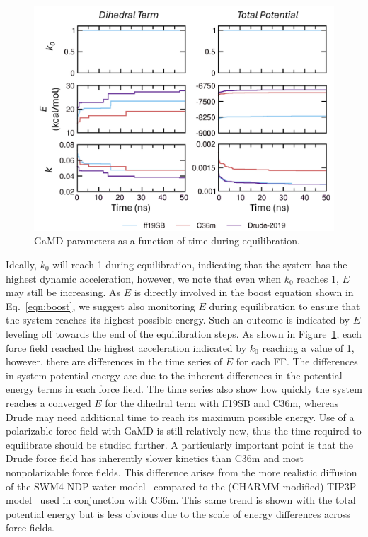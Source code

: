 \documentclass[9pt,tutorial,pubversion]{livecoms}
\begin{document}
\begin{figure}[h] 
    \includegraphics[width=\columnwidth]{main_figs/equil_conv.png}
    \caption{GaMD parameters as a function of time during equilibration.}
    \label{fig:equil_conv_alad}
\end{figure}

Ideally, $k_{0}$ will reach 1 during equilibration, indicating that the system has the highest dynamic acceleration, however, we note that even when $k_{0}$ reaches 1, $E$ may still be increasing. As $E$ is directly involved in the boost equation shown in Eq.~\ref{eqn:boost}, we suggest also monitoring $E$ during equilibration to ensure that the system reaches its highest possible energy. Such an outcome is indicated by $E$ leveling off towards the end of the equilibration steps. As shown in Figure~\ref{fig:equil_conv_alad}, each force field reached the highest acceleration indicated by $k_{0}$ reaching a value of 1, however, there are differences in the time series of $E$ for each FF. The differences in system potential energy are due to the inherent differences in the  potential energy terms in each force field. The time series also show how quickly the system reaches a converged $E$ for the dihedral term with ff19SB and C36m, whereas Drude may need additional time to reach its maximum possible energy. Use of a polarizable force field with GaMD is still relatively new, thus the time required to equilibrate should be studied further. A particularly important point is that the Drude force field has inherently slower kinetics than C36m and most nonpolarizable force fields. This difference arises from the more realistic diffusion of the SWM4-NDP water model~\cite{lamoureux_swm4_2006} compared to the (CHARMM-modified) TIP3P model~\cite{jorgensen_tip3p_1983,durell_solv_1994,neria_activate_1996} used in conjunction with C36m. This same trend is shown with the total potential energy but is less obvious due to the scale of energy differences across force fields.
\end{document}

